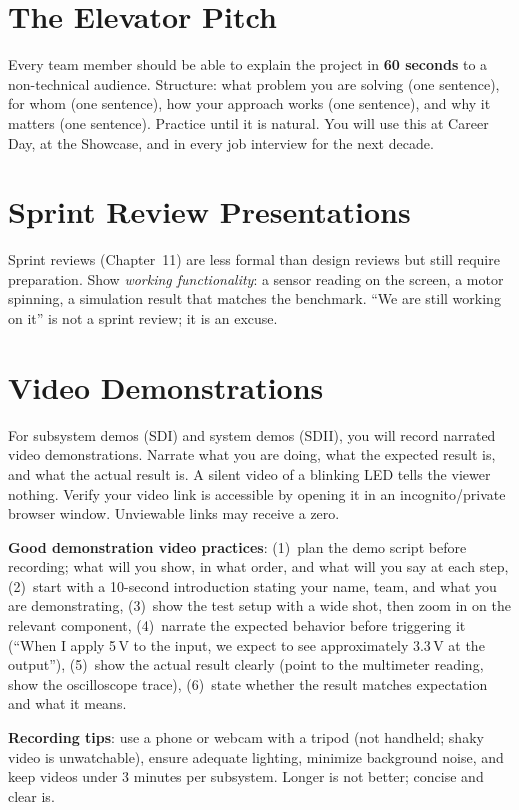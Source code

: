 \section{The Elevator Pitch}
Every team member should be able to explain the project in \textbf{60 seconds} to a non-technical audience. Structure: what problem you are solving (one sentence), for whom (one sentence), how your approach works (one sentence), and why it matters (one sentence). Practice until it is natural. You will use this at Career Day, at the Showcase, and in every job interview for the next decade.

\section{Sprint Review Presentations}
Sprint reviews (Chapter~11) are less formal than design reviews but still require preparation. Show \emph{working functionality}: a sensor reading on the screen, a motor spinning, a simulation result that matches the benchmark. ``We are still working on it'' is not a sprint review; it is an excuse.

\section{Video Demonstrations}
For subsystem demos (SDI) and system demos (SDII), you will record narrated video demonstrations. Narrate what you are doing, what the expected result is, and what the actual result is. A silent video of a blinking LED tells the viewer nothing. Verify your video link is accessible by opening it in an incognito/private browser window. Unviewable links may receive a zero.

\textbf{Good demonstration video practices}: (1)~plan the demo script before recording; what will you show, in what order, and what will you say at each step, (2)~start with a 10-second introduction stating your name, team, and what you are demonstrating, (3)~show the test setup with a wide shot, then zoom in on the relevant component, (4)~narrate the expected behavior before triggering it (``When I apply 5\,V to the input, we expect to see approximately 3.3\,V at the output''), (5)~show the actual result clearly (point to the multimeter reading, show the oscilloscope trace), (6)~state whether the result matches expectation and what it means.

\textbf{Recording tips}: use a phone or webcam with a tripod (not handheld; shaky video is unwatchable), ensure adequate lighting, minimize background noise, and keep videos under 3 minutes per subsystem. Longer is not better; concise and clear is.

